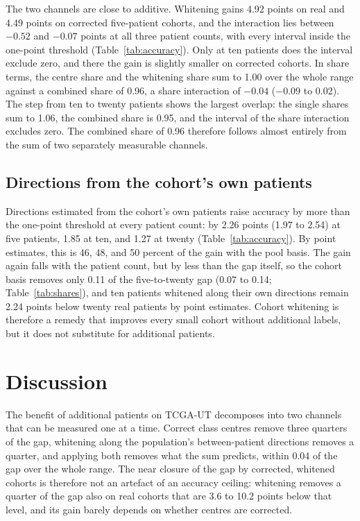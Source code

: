 \documentclass[11pt]{article}
\begin{document}
\noindent The two channels are close to additive. Whitening gains 4.92 points on real and 4.49 points on corrected five-patient cohorts, and the interaction lies between $-0.52$ and $-0.07$ points at all three patient counts, with every interval inside the one-point threshold (Table~\ref{tab:accuracy}). Only at ten patients does the interval exclude zero, and there the gain is slightly smaller on corrected cohorts. In share terms, the centre share and the whitening share sum to 1.00 over the whole range against a combined share of 0.96, a share interaction of $-0.04$ ($-0.09$ to 0.02). The step from ten to twenty patients shows the largest overlap: the single shares sum to 1.06, the combined share is 0.95, and the interval of the share interaction excludes zero. The combined share of 0.96 therefore follows almost entirely from the sum of two separately measurable channels.

\subsection{Directions from the cohort's own patients}
\label{sec:remedy}
Directions estimated from the cohort's own patients raise accuracy by more than the one-point threshold at every patient count: by 2.26 points (1.97 to 2.54) at five patients, 1.85 at ten, and 1.27 at twenty (Table~\ref{tab:accuracy}). By point estimates, this is 46, 48, and 50 percent of the gain with the pool basis. The gain again falls with the patient count, but by less than the gap itself, so the cohort basis removes only 0.11 of the five-to-twenty gap (0.07 to 0.14; Table~\ref{tab:shares}), and ten patients whitened along their own directions remain 2.24 points below twenty real patients by point estimates. Cohort whitening is therefore a remedy that improves every small cohort without additional labels, but it does not substitute for additional patients.

\section{Discussion}
\label{sec:discussion}
The benefit of additional patients on TCGA-UT decomposes into two channels that can be measured one at a time. Correct class centres remove three quarters of the gap, whitening along the population's between-patient directions removes a quarter, and applying both removes what the sum predicts, within 0.04 of the gap over the whole range. The near closure of the gap by corrected, whitened cohorts is therefore not an artefact of an accuracy ceiling: whitening removes a quarter of the gap also on real cohorts that are 3.6 to 10.2 points below that level, and its gain barely depends on whether centres are corrected.
\end{document}
